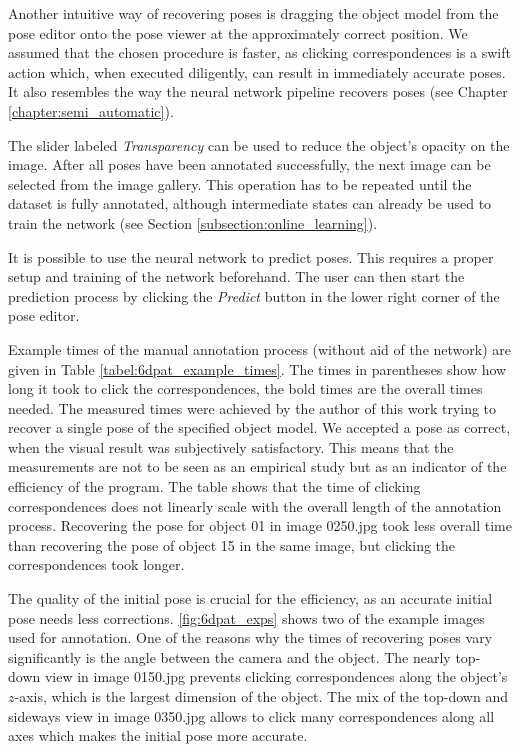Another intuitive way of recovering poses is dragging the object model from the pose editor onto the pose viewer at the approximately correct position. We assumed that the chosen procedure is faster, as clicking correspondences is a swift action which, when executed diligently, can result in immediately accurate poses. It also resembles the way the neural network pipeline recovers poses (see Chapter \ref{chapter:semi_automatic}).

The slider labeled \textit{Transparency} can be used to reduce the object's opacity on the image. After all poses have been annotated successfully, the next image can be selected from the image gallery. This operation has to be repeated until the dataset is fully annotated, although intermediate states can already be used to train the network (see Section \ref{subsection:online_learning}).

It is possible to use the neural network to predict poses. This requires a proper setup and training of the network beforehand. The user can then start the prediction process by clicking the \textit{Predict} button in the lower right corner of the pose editor.

Example times of the manual annotation process (without aid of the network) are given in Table \ref{tabel:6dpat_example_times}. The times in parentheses show how long it took to click the correspondences, the bold times are the overall times needed. The measured times were achieved by the author of this work trying to recover a single pose of the specified object model. We accepted a pose as correct, when the visual result was subjectively satisfactory. This means that the measurements are not to be seen as an empirical study  but as an indicator of the efficiency of the program. The table shows that the time of clicking correspondences does not linearly scale with the overall length of the annotation process. Recovering the pose for object 01 in image 0250.jpg took less overall time than recovering the pose of object 15 in the same image, but clicking the correspondences took longer.

The quality of the initial pose is crucial for the efficiency, as an accurate initial pose needs less corrections. \fig \ref{fig:6dpat_exps} shows two of the example images used for annotation. One of the reasons why the times of recovering poses vary significantly is the angle between the camera and the object. The nearly top-down view in image 0150.jpg prevents clicking correspondences along the object's $z$-axis, which is the largest dimension of the object. The mix of the top-down and sideways view in image 0350.jpg allows to click many correspondences along all axes which makes the initial pose more accurate. 

